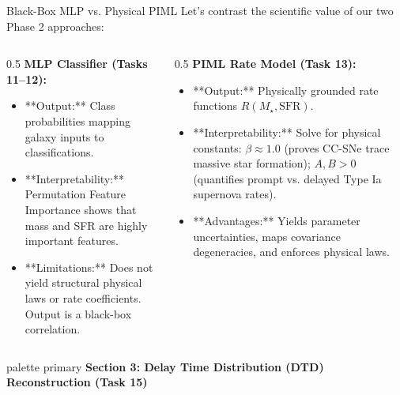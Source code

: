\documentclass[9pt]{beamer}
\begin{document}
\begin{frame}{Black-Box MLP vs. Physical PIML}
  Let's contrast the scientific value of our two Phase 2 approaches:
  \begin{columns}
    \begin{column}{0.5\textwidth}
      \alert{\textbf{MLP Classifier (Tasks 11--12):}}
      \begin{itemize}
        \item **Output:** Class probabilities mapping galaxy inputs to classifications.
        \item **Interpretability:** Permutation Feature Importance shows that mass and SFR are highly important features.
        \item **Limitations:** Does not yield structural physical laws or rate coefficients. Output is a black-box correlation.
      \end{itemize}
    \end{column}
    \begin{column}{0.5\textwidth}
      \alert{\textbf{PIML Rate Model (Task 13):}}
      \begin{itemize}
        \item **Output:** Physically grounded rate functions $R(M_\star, \text{SFR})$.
        \item **Interpretability:** Solve for physical constants: $\beta \approx 1.0$ (proves CC-SNe trace massive star formation); $A, B > 0$ (quantifies prompt vs. delayed Type Ia supernova rates).
        \item **Advantages:** Yields parameter uncertainties, maps covariance degeneracies, and enforces physical laws.
      \end{itemize}
    \end{column}
  \end{columns}
\end{frame}

\begin{frame}[plain]
  \vfill
  \centering
  \begin{beamercolorbox}[sep=8pt,center,shadow=true,rounded=true]{palette primary}
    \textbf{Section 3: Delay Time Distribution (DTD) Reconstruction (Task 15)}
  \end{beamercolorbox}
  \vfill
\end{frame}
\end{document}
